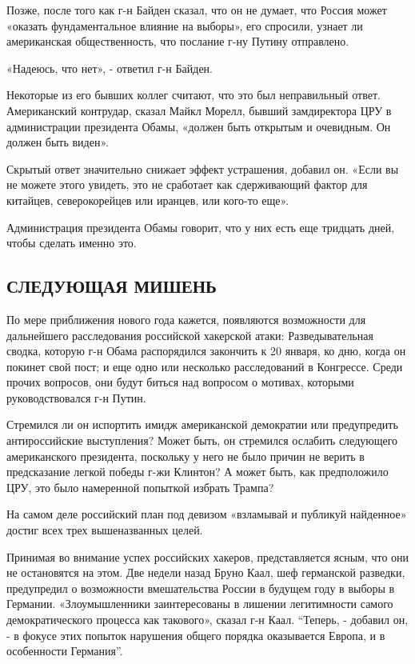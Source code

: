 Позже, после того как г-н Байден сказал, что он не думает, что Россия
может «оказать фундаментальное влияние на выборы», его спросили, узнает
ли американская общественность, что послание г-ну Путину отправлено.

«Надеюсь, что нет», - ответил г-н Байден.

Некоторые из его бывших коллег считают, что это был неправильный ответ.
Американский контрудар, сказал Майкл Морелл, бывший замдиректора ЦРУ в
администрации президента Обамы, «должен быть открытым и очевидным. Он
должен быть виден».

Скрытый ответ значительно снижает эффект устрашения, добавил он. «Если
вы не можете этого увидеть, это не сработает как сдерживающий фактор для
китайцев, северокорейцев или иранцев, или кого-то еще».

Администрация президента Обамы говорит, что у них есть еще тридцать
дней, чтобы сделать именно это.

\hypertarget{ux441ux43bux435ux434ux443ux44eux449ux430ux44f-ux43cux438ux448ux435ux43dux44c}{%
\subsection{\texorpdfstring{\textbf{СЛЕДУЮЩАЯ
МИШЕНЬ}}{СЛЕДУЮЩАЯ МИШЕНЬ}}\label{ux441ux43bux435ux434ux443ux44eux449ux430ux44f-ux43cux438ux448ux435ux43dux44c}}

По мере приближения нового года кажется, появляются возможности для
дальнейшего расследования российской хакерской атаки: Разведывательная
сводка, которую г-н Обама распорядился закончить к 20 января, ко дню,
когда он покинет свой пост; и еще одно или несколько расследований в
Конгрессе. Среди прочих вопросов, они будут биться над вопросом о
мотивах, которыми руководствовался г-н Путин.

Стремился ли он испортить имидж американской демократии или предупредить
антироссийские выступления? Может быть, он стремился ослабить следующего
американского президента, поскольку у него не было причин не верить в
предсказание легкой победы г-жи Клинтон? А может быть, как предположило
ЦРУ, это было намеренной попыткой избрать Трампа?

На самом деле российский план под девизом «взламывай и публикуй
найденное» достиг всех трех вышеназванных целей.

Принимая во внимание успех российских хакеров, представляется ясным, что
они не остановятся на этом. Две недели назад Бруно Каал, шеф германской
разведки, предупредил о возможности вмешательства России в будущем году
в выборы в Германии. «Злоумышленники заинтересованы в лишении
легитимности самого демократического процесса как такового», сказал г-н
Каал. ``Теперь, - добавил он, - в фокусе этих попыток нарушения общего
порядка оказывается Европа, и в особенности Германия''.

